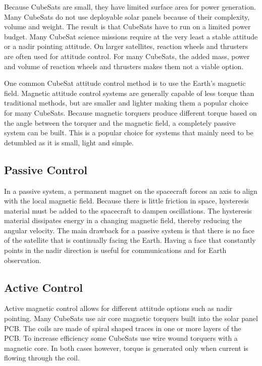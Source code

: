 Because CubeSats are small, they have limited surface area for power generation. Many CubeSats do not use deployable solar panels because of their complexity, volume and weight. The result is that CubeSats have to run on a limited power budget. Many CubeSat science missions require at the very least a stable attitude or a nadir pointing attitude. On larger satellites, reaction wheels and thrusters are often used for attitude control. For many CubeSats, the added mass, power and volume of reaction wheels and thrusters makes them not a  viable option.

One common CubeSat attitude control method is to use the Earth's magnetic field. Magnetic attitude control systems are generally capable of less torque than traditional methods, but are smaller and lighter making them a popular choice for many CubeSats. Because magnetic torquers produce different torque based on the angle between the torquer and the magnetic field, a completely passive system can be built. This is a popular choice for systems that mainly need to be detumbled as it is small, light and simple. 

\subsection{Passive Control}

In a passive system, a permanent magnet on the spacecraft forces an axis to align with the local magnetic field. Because there is little friction in space, hysteresis material must be added to the spacecraft to dampen oscillations. The hysteresis material dissipates energy in a changing magnetic field, thereby reducing the angular velocity. The main drawback for a passive system is that there is no face of the satellite that is continually facing the Earth. Having a face that constantly points in the nadir direction is useful for communications and for Earth observation.

\subsection{Active Control}

Active magnetic control allows for different attitude options such as nadir pointing. Many CubeSats use air core magnetic torquers built into the solar panel \ac{PCB}. The coils are made of spiral shaped traces in one or more layers of the \ac{PCB}. To increase efficiency some CubeSats use wire wound torquers with a magnetic core. In both cases however, torque is generated only when current is flowing through the coil. 

